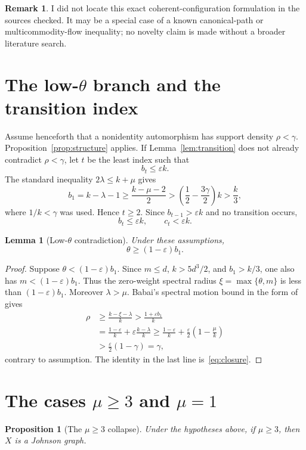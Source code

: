 \documentclass[11pt]{amsart}
\newtheorem{proposition}[theorem]{Proposition}
\newtheorem{lemma}[theorem]{Lemma}
\theoremstyle{definition}
\newtheorem{remark}[theorem]{Remark}
\newcommand{\eps}{\varepsilon}
\newcommand{\gam}{\gamma}
\begin{document}
\begin{remark}
I did not locate this exact coherent-configuration formulation in the sources checked.  It may be a special case of a known canonical-path or multicommodity-flow inequality; no novelty claim is made without a broader literature search.
\end{remark}

\section{The low-$\theta$ branch and the transition index}
Assume henceforth that a nonidentity automorphism has support density $\rho<\gam$.  Proposition~\ref{prop:structure} applies.  If Lemma~\ref{lem:transition} does not already contradict $\rho<\gam$, let $t$ be the least index such that
\[
 b_t\le\eps k.
\]
The standard inequality $2\lambda\le k+\mu$ gives
\[
 b_1=k-\lambda-1\ge\frac{k-\mu-2}{2}
 >\left(\frac12-\frac{3\gam}{2}\right)k>\frac{k}{3},
\]
where $1/k<\gam$ was used.  Hence $t\ge2$.  Since $b_{t-1}>\eps k$ and no transition occurs,
\begin{equation}\label{eq:smallbtct}
 b_t\le\eps k,\qquad c_t<\eps k.
\end{equation}

\begin{lemma}[Low-$\theta$ contradiction]\label{lem:lowtheta}
Under these assumptions,
\[
 \theta\ge(1-\eps)b_1.
\]
\end{lemma}

\begin{proof}
Suppose $\theta<(1-\eps)b_1$.  Since $m\le d$, $k>5d^3/2$, and $b_1>k/3$, one also has $m<(1-\eps)b_1$.  Thus the zero-weight spectral radius $\xi=\max\{\theta,m\}$ is less than $(1-\eps)b_1$.  Moreover $\lambda>\mu$.  Babai's spectral motion bound in the form of~\cite[Proposition 2.13]{PS} gives
\begin{align*}
 \rho
 &\ge\frac{k-\xi-\lambda}{k}
 >\frac{1+\eps b_1}{k}\\
 &=\frac{1-\eps}{k}+\eps\frac{k-\lambda}{k}
 \ge\frac{1-\eps}{k}+\frac\eps2\left(1-\frac\mu k\right)\\
 &>\frac\eps2(1-\gam)=\gam,
\end{align*}
contrary to assumption.  The identity in the last line is~\eqref{eq:closure}.
\end{proof}

\section{The cases $\mu\ge3$ and $\mu=1$}
\begin{proposition}[The $\mu\ge3$ collapse]\label{prop:mu3}
Under the hypotheses above, if $\mu\ge3$, then $X$ is a Johnson graph.
\end{proposition}
\end{document}
